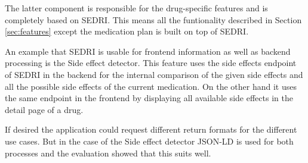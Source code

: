 The latter component is responsible for the drug-specific features and is completely based on SEDRI.
This means all the funtionality described in Section \ref{sec:features} except the medication plan is built on top of SEDRI.

An example that SEDRI is usable for frontend information as well as backend processing is the Side effect detector.
This feature uses the side effects endpoint of SEDRI in the backend for the internal comparison of the given side effects and all the possible side effects of the current medication.
On the other hand it uses the same endpoint in the frontend by displaying all available side effects in the detail page of a drug.

If desired the application could request different return formats for the different use cases.
But in the case of the Side effect detector JSON-LD is used for both processes and the evaluation showed that this suits well.
